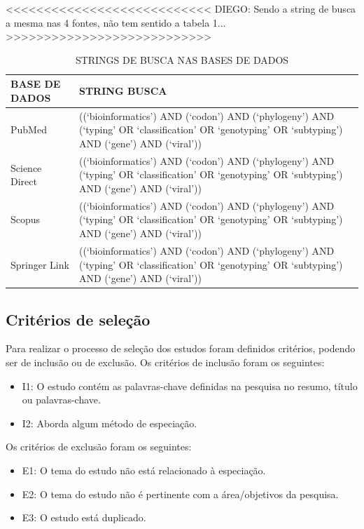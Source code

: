 \documentclass[12pt]{article}
\begin{document}
<<<<<<<<<<<<<<<<<<<<<<<<<<<
DIEGO: Sendo a string de busca a mesma nas 4 fontes, não tem sentido a tabela 1...
>>>>>>>>>>>>>>>>>>>>>>>>>>>

\begin{table}[h]
    \centering

    \caption{STRINGS DE BUSCA NAS BASES DE DADOS}
    \label{tab:stringBuscaBase}
    \begin{tabular}{|p{2cm}|p{10cm}|}
        \hline
        BASE DE DADOS  & STRING BUSCA

        \\
        \hline
        PubMed         & ((`bioinformatics') AND (`codon') AND (`phylogeny') AND (`typing' OR `classification' OR `genotyping' OR `subtyping') AND (`gene') AND (`viral'))
        \\
        \hline
        Science Direct & ((`bioinformatics') AND (`codon') AND (`phylogeny') AND (`typing' OR `classification' OR `genotyping' OR `subtyping') AND (`gene') AND (`viral')) \\
        \hline
        Scopus         & ((`bioinformatics') AND (`codon') AND (`phylogeny') AND (`typing' OR `classification' OR `genotyping' OR `subtyping') AND (`gene') AND (`viral'))
        \\
        \hline
        Springer Link  & ((`bioinformatics') AND (`codon') AND (`phylogeny') AND (`typing' OR `classification' OR `genotyping' OR `subtyping') AND (`gene') AND (`viral'))
        \\
        \hline
    \end{tabular}

\end{table}

\subsection{Critérios de seleção}

Para realizar o processo de seleção dos estudos foram definidos critérios, podendo ser de inclusão ou de exclusão.
Os critérios de inclusão foram os seguintes:

\begin{itemize}
    \item I1: O estudo contém as palavras-chave definidas na pesquisa no resumo, título ou palavras-chave.
    \item I2: Aborda algum método de especiação.
\end{itemize}
Os critérios de exclusão foram os seguintes:
\begin{itemize}
    \item E1: O tema do estudo não está relacionado à especiação.
    \item E2: O tema do estudo não é pertinente com a área/objetivos da pesquisa.
    \item E3: O estudo está duplicado.
\end{itemize}
\end{document}
